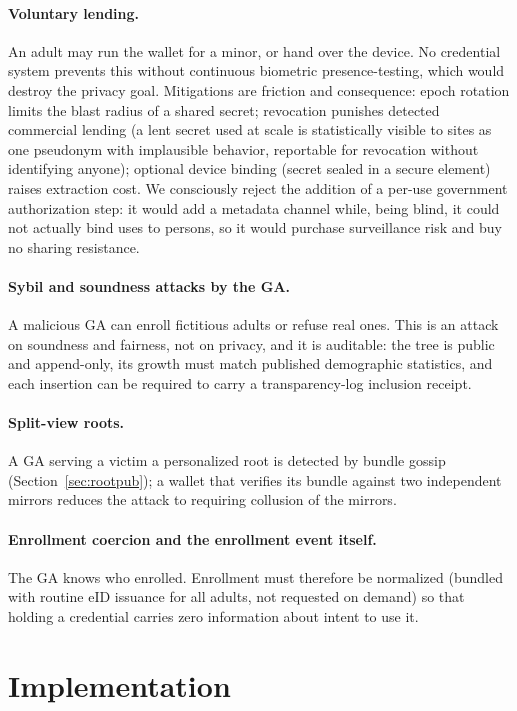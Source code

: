\documentclass[11pt]{article}
\theoremstyle{definition}
\begin{document}
\paragraph{Voluntary lending.} An adult may run the wallet for a minor, or hand over the
device. No credential system prevents this without continuous biometric presence-testing,
which would destroy the privacy goal. Mitigations are friction and consequence: epoch
rotation limits the blast radius of a shared secret; revocation punishes detected
commercial lending (a lent secret used at scale is statistically visible to sites as one
pseudonym with implausible behavior, reportable for revocation without identifying
anyone); optional device binding (secret sealed in a secure element) raises extraction
cost. We consciously reject the addition of a per-use government authorization step: it
would add a metadata channel while, being blind, it could not actually bind uses to
persons, so it would purchase surveillance risk and buy no sharing resistance.

\paragraph{Sybil and soundness attacks by the GA.} A malicious GA can enroll fictitious
adults or refuse real ones. This is an attack on soundness and fairness, not on privacy,
and it is auditable: the tree is public and append-only, its growth must match published
demographic statistics, and each insertion can be required to carry a transparency-log
inclusion receipt.

\paragraph{Split-view roots.} A GA serving a victim a personalized root is detected by
bundle gossip (Section~\ref{sec:rootpub}); a wallet that verifies its bundle against two
independent mirrors reduces the attack to requiring collusion of the mirrors.

\paragraph{Enrollment coercion and the enrollment event itself.} The GA knows who
enrolled. Enrollment must therefore be normalized (bundled with routine eID issuance for
all adults, not requested on demand) so that holding a credential carries zero information
about intent to use it.

\section{Implementation}
\label{sec:impl}
\end{document}
